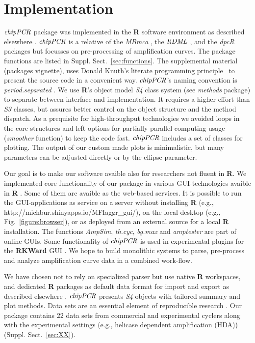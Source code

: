 \documentclass{bioinfo}
\begin{document}
\section{Implementation}
\begin{methods}
$\emph{chipPCR}$ package was implemented in the \textbf{R} software environment 
as described elsewhere \citep{RCT_2013,rodiger_rkward_2012}. $\emph{chipPCR}$ is 
a relative of the \emph{MBmca} \citep{roediger_RJ_2013}, the $\emph{RDML}$  
\citep{blagodatskikh_2014}, and the \emph{dpcR} \citep{pabinger_2014} packages but 
focusses on pre-processing of amplification curves. The package functions are 
listed in Suppl. Sect.~\ref{sec:functions}. The supplemental material 
(packages vignette), uses Donald Knuth's literate programming 
principle~\citep{Knuth1984} to present the source code in a convenient way. 
$\emph{chipPCR}$'s naming convention is \textit{period.separated} 
\citep{Baaaath_2012}. We use \textbf{R}'s object model \emph{S4} class system 
(see \emph{methods} package) to separate between interface and implementation. 
It requires a higher effort than \emph{S3} classes, but assures better control 
on the object structure and the method dispatch. As a prequisite for high-throughput
technologies we avoided loops in the core structures and left options for partially
parallel computing usage (\textsl{smoother} function) to keep the code fast.
$\emph{chipPCR}$ includes a set of classes for 
plotting. The output of our custom made plots is minimalistic, but many 
parameters can be adjusted directly or by the ellipse parameter.

Our goal is to make our software avaible also for researchers not
fluent in \textbf{R}. We implemented core functionality of our package in various
GUI-technologies avaible in \textbf{R} \citep{rodiger_rkward_2012, shiny_2014}. 
Some of them are avaible as the web-based services. It is possible to run the 
GUI-applications as service on a server without installing \textbf{R} (e.g., 
http://michbur.shinyapps.io/MFIaggr\_gui/), on the local desktop (e.g., 
Fig.~\ref{figure:browser}), or as deployed from an external source for a local 
\textbf{R} installation. The functions \textsl{AmpSim}, \textsl{th.cyc}, 
\textsl{bg.max} and \textsl{amptester} are part of online GUIs.  Some 
functionality of $\emph{chipPCR}$ is used in experimental plugins 
for the \textbf{RKWard} GUI \citep{pabinger_2014}. 
We hope to build monolithic systems to parse, pre-process and analyze 
amplification curve data in a combined work-flow. 

We have chosen not to rely on specialized parser but use native \textbf{R} 
workspaces, and dedicated \textbf{R} packages as default data format for import 
and export as described elsewhere . 
$\emph{chipPCR}$ presents \emph{S4} objects with tailored summary and plot 
methods. Data sets are an essential element of reproducible research 
\citep{Leeper_2014}. Our package contains 22 data sets from commercial and 
experimental cyclers along with the experimental settings (e.g., helicase 
dependent amplification (HDA)) (Suppl. Sect.~\ref{sec:XX}).
\end{methods}
\end{document}

